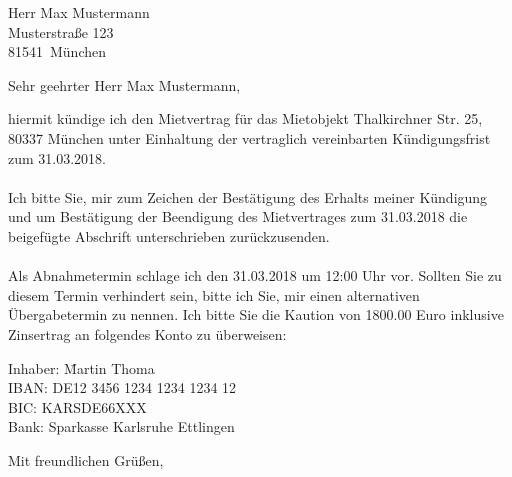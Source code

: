 \documentclass[a4paper, 12pt, KOMAold]{scrlttr2}
\newcommand{\Mietobjekt}{Thalkirchner Str. 25, 80337 München}       %
\newcommand{\Kaution}{1800.00 Euro}                                 %
\newcommand{\BankaccountOwner}{Martin Thoma}                        %
\newcommand{\BankaccountIBAN}{DE12 3456 1234 1234 1234 12}          %
\newcommand{\BankaccountBIC}{KARSDE66XXX}                           %
\newcommand{\BankaccountBank}{Sparkasse Karlsruhe Ettlingen}        %
\newcommand{\Schluesseluebergabe}{31.03.2018 um 12:00 Uhr}          %
\newcommand{\Kuendigungsdatum}{31.03.2018}                          %
\newcommand{\Empfaenger}{Herr Max Mustermann} %
\newcommand{\EStrasse}{Musterstraße 123}    %
\newcommand{\EPLZ}{81541}                   %
\newcommand{\EOrt}{München}                 %
\newenvironment{allintypewriter}{\ttfamily}{\par}
\begin{document}
    \begin{letter}{\Empfaenger \\ \EStrasse \\ \EPLZ~\EOrt}
    \date{\today}%
    \subject{Kündigung des Mietvertrags}
    \opening{Sehr geehrter \Empfaenger,}
    hiermit kündige ich den Mietvertrag für das Mietobjekt \Mietobjekt{} unter
    Einhaltung der vertraglich vereinbarten Kündigungsfrist zum
    \Kuendigungsdatum{}.\\
    \\
    Ich bitte Sie, mir zum Zeichen der Bestätigung des Erhalts meiner
    Kündigung und um Bestätigung der Beendigung des Mietvertrages zum
    \Kuendigungsdatum{} die beigefügte Abschrift unterschrieben zurückzusenden.\\
    \\
    Als Abnahmetermin schlage ich den \Schluesseluebergabe{} vor. Sollten Sie zu diesem Termin verhindert sein, bitte ich Sie, mir einen alternativen Übergabetermin zu nennen. Ich bitte Sie die Kaution von \Kaution{}
    inklusive Zinsertrag an folgendes Konto zu überweisen:

    \begin{allintypewriter}
    \begin{tabbing}
    Inhaber: \=\BankaccountOwner{}\\
    IBAN:    \>\BankaccountIBAN{}\\
    BIC:     \>\BankaccountBIC{}\\
    Bank:    \>\BankaccountBank{}\\
    \end{tabbing}
    \end{allintypewriter}

    \closing{Mit freundlichen Grüßen,}
    \end{letter}
\end{document}
